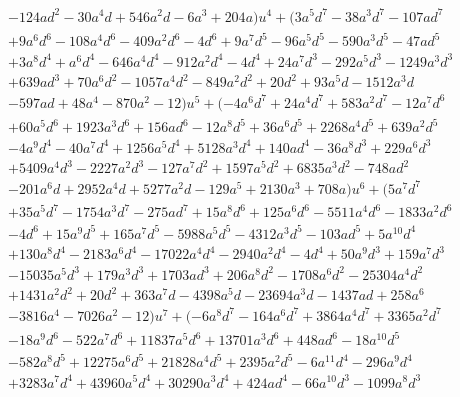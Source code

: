 \documentclass{gtpart}
\theoremstyle{definition}
\theoremstyle{remark}
\begin{document}
\begin{equation*}
\begin{split}
\qquad& - 124 a d^2 - 30 a^4 d + 546 a^2 d - 6 a^3 + 204 a) u^4 + (3 a^5 d^7 - 38 a^3 d^7 - 107 a d^7 \\
      & + 9 a^6 d^6 - 108 a^4 d^6 - 409 a^2 d^6 - 4 d^6 + 9 a^7 d^5 - 96 a^5 d^5 - 590 a^3 d^5 - 47 a d^5 \\
      & + 3 a^8 d^4 + a^6 d^4 - 646 a^4 d^4 - 912 a^2 d^4 - 4 d^4 + 24 a^7 d^3 - 292 a^5 d^3 - 1249 a^3 d^3 \\
      & + 639 a d^3 + 70 a^6 d^2 - 1057 a^4 d^2 - 849 a^2 d^2 + 20 d^2 + 93 a^5 d - 1512 a^3 d \\
      & - 597 a d + 48 a^4 - 870 a^2 - 12) u^5 + (-4 a^6 d^7 + 24 a^4 d^7 + 583 a^2 d^7 - 12 a^7 d^6 \\
      & + 60 a^5 d^6 + 1923 a^3 d^6 + 156 a d^6 - 12 a^8 d^5 + 36 a^6 d^5 + 2268 a^4 d^5 + 639 a^2 d^5 \\
      & - 4 a^9 d^4 - 40 a^7 d^4 + 1256 a^5 d^4 + 5128 a^3 d^4 + 140 a d^4 - 36 a^8 d^3 + 229 a^6 d^3 \\
      & + 5409 a^4 d^3 - 2227 a^2 d^3 - 127 a^7 d^2 + 1597 a^5 d^2 + 6835 a^3 d^2 - 748 a d^2 \\
      & - 201 a^6 d + 2952 a^4 d + 5277 a^2 d - 129 a^5 + 2130 a^3 + 708 a) u^6 + (5 a^7 d^7 \\
      & + 35 a^5 d^7 - 1754 a^3 d^7 - 275 a d^7 + 15 a^8 d^6 + 125 a^6 d^6 - 5511 a^4 d^6 - 1833 a^2 d^6 \\
      & - 4 d^6 + 15 a^9 d^5 + 165 a^7 d^5 - 5988 a^5 d^5 - 4312 a^3 d^5 - 103 a d^5 + 5 a^{10} d^4 \\
      & + 130 a^8 d^4 - 2183 a^6 d^4 - 17022 a^4 d^4 - 2940 a^2 d^4 - 4 d^4 + 50 a^9 d^3 + 159 a^7 d^3 \\
      & - 15035 a^5 d^3 + 179 a^3 d^3 + 1703 a d^3 + 206 a^8 d^2 - 1708 a^6 d^2 - 25304 a^4 d^2 \\
      & + 1431 a^2 d^2 + 20 d^2 + 363 a^7 d - 4398 a^5 d - 23694 a^3 d - 1437 a d + 258 a^6 \\
      & - 3816 a^4 - 7026 a^2 - 12) u^7 + (-6 a^8 d^7 - 164 a^6 d^7 + 3864 a^4 d^7 + 3365 a^2 d^7 \\
      & - 18 a^9 d^6 - 522 a^7 d^6 + 11837 a^5 d^6 + 13701 a^3 d^6 + 448 a d^6 - 18 a^{10} d^5 \\
      & - 582 a^8 d^5 + 12275 a^6 d^5 + 21828 a^4 d^5 + 2395 a^2 d^5 - 6 a^{11} d^4 - 296 a^9 d^4 \\
      & + 3283 a^7 d^4 + 43960 a^5 d^4 + 30290 a^3 d^4 + 424 a d^4 - 66 a^{10} d^3 - 1099 a^8 d^3 \\

\end{split}
\end{equation*}
\end{document}
